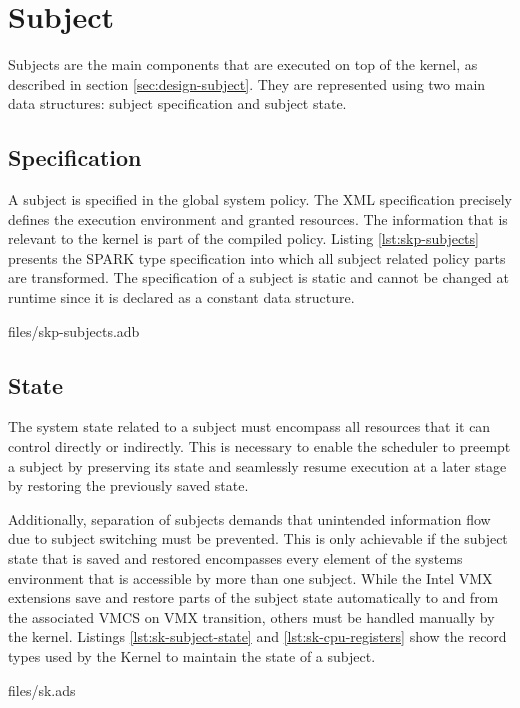 \section{Subject}\label{sec:impl-subject}
Subjects are the main components that are executed on top of the kernel, as
described in section \ref{sec:design-subject}. They are represented using two
main data structures: subject specification and subject state.

\subsection{Specification}
A subject is specified in the global system policy. The XML specification
precisely defines the execution environment and granted resources. The
information that is relevant to the kernel is part of the compiled policy.
Listing \ref{lst:skp-subjects} presents the SPARK type specification into which
all subject related policy parts are transformed. The specification of a subject
is static and cannot be changed at runtime since it is declared as a constant
data structure.


	{files/skp-subjects.adb}

\subsection{State}
The system state related to a subject must encompass all resources that it can
control directly or indirectly. This is necessary to enable the scheduler to
preempt a subject by preserving its state and seamlessly resume execution at a
later stage by restoring the previously saved state.

Additionally, separation of subjects demands that unintended information flow
due to subject switching must be prevented. This is only achievable if the
subject state that is saved and restored encompasses every element of the
systems environment that is accessible by more than one subject. While the Intel
VMX extensions save and restore parts of the subject state automatically to and
from the associated VMCS on VMX transition, others must be handled manually by
the kernel. Listings \ref{lst:sk-subject-state} and \ref{lst:sk-cpu-registers}
show the record types used by the Kernel to maintain the state of a subject.


	{files/sk.ads}

